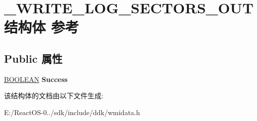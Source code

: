 \hypertarget{struct___w_r_i_t_e___l_o_g___s_e_c_t_o_r_s___o_u_t}{}\section{\+\_\+\+W\+R\+I\+T\+E\+\_\+\+L\+O\+G\+\_\+\+S\+E\+C\+T\+O\+R\+S\+\_\+\+O\+U\+T结构体 参考}
\label{struct___w_r_i_t_e___l_o_g___s_e_c_t_o_r_s___o_u_t}
\subsection*{Public 属性}
\begin{DoxyCompactItemize}
\item 
\mbox{\label{struct___w_r_i_t_e___l_o_g___s_e_c_t_o_r_s___o_u_t_a735ff8d42dcba590df74fd6f6fb11bb4}} 
\hyperlink{_processor_bind_8h_a112e3146cb38b6ee95e64d85842e380a}{B\+O\+O\+L\+E\+AN} {\bfseries Success}
\end{DoxyCompactItemize}


该结构体的文档由以下文件生成\+:\begin{DoxyCompactItemize}
\item 
E\+:/\+React\+O\+S-\/0../sdk/include/ddk/wmidata.\+h\end{DoxyCompactItemize}
